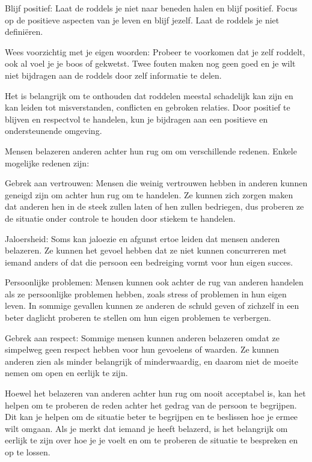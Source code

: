 Blijf positief: Laat de roddels je niet naar beneden halen en blijf positief. Focus op de positieve aspecten van je leven en blijf jezelf. Laat de roddels je niet definiëren.

Wees voorzichtig met je eigen woorden: Probeer te voorkomen dat je zelf roddelt, ook al voel je je boos of gekwetst. Twee fouten maken nog geen goed en je wilt niet bijdragen aan de roddels door zelf informatie te delen.

Het is belangrijk om te onthouden dat roddelen meestal schadelijk kan zijn en kan leiden tot misverstanden, conflicten en gebroken relaties. Door positief te blijven en respectvol te handelen, kun je bijdragen aan een positieve en ondersteunende omgeving.

Mensen belazeren anderen achter hun rug om om verschillende redenen. Enkele mogelijke redenen zijn:

Gebrek aan vertrouwen: Mensen die weinig vertrouwen hebben in anderen kunnen geneigd zijn om achter hun rug om te handelen. Ze kunnen zich zorgen maken dat anderen hen in de steek zullen laten of hen zullen bedriegen, dus proberen ze de situatie onder controle te houden door stiekem te handelen.

Jaloersheid: Soms kan jaloezie en afgunst ertoe leiden dat mensen anderen belazeren. Ze kunnen het gevoel hebben dat ze niet kunnen concurreren met iemand anders of dat die persoon een bedreiging vormt voor hun eigen succes.

Persoonlijke problemen: Mensen kunnen ook achter de rug van anderen handelen als ze persoonlijke problemen hebben, zoals stress of problemen in hun eigen leven. In sommige gevallen kunnen ze anderen de schuld geven of zichzelf in een beter daglicht proberen te stellen om hun eigen problemen te verbergen.

Gebrek aan respect: Sommige mensen kunnen anderen belazeren omdat ze simpelweg geen respect hebben voor hun gevoelens of waarden. Ze kunnen anderen zien als minder belangrijk of minderwaardig, en daarom niet de moeite nemen om open en eerlijk te zijn.

Hoewel het belazeren van anderen achter hun rug om nooit acceptabel is, kan het helpen om te proberen de reden achter het gedrag van de persoon te begrijpen. Dit kan je helpen om de situatie beter te begrijpen en te beslissen hoe je ermee wilt omgaan. Als je merkt dat iemand je heeft belazerd, is het belangrijk om eerlijk te zijn over hoe je je voelt en om te proberen de situatie te bespreken en op te lossen.

